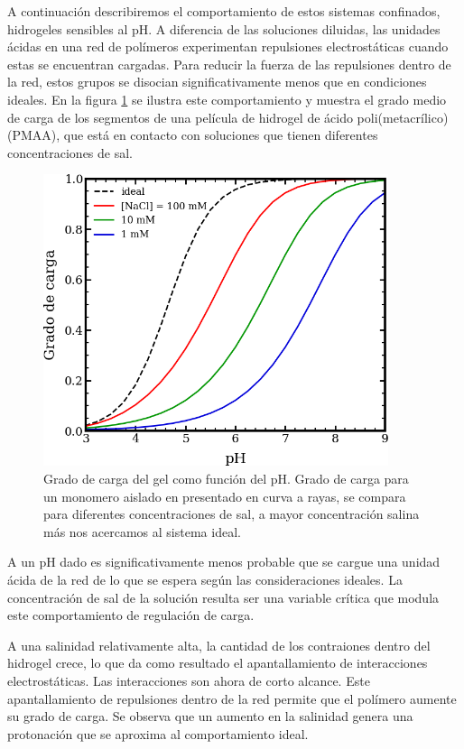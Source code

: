 A continuaci\'on describiremos el comportamiento de estos sistemas confinados, hidrogeles sensibles al pH.  A diferencia de las soluciones diluidas, las unidades \'acidas en una red de pol\'imeros experimentan repulsiones electrost\'aticas cuando estas se encuentran cargadas. Para reducir la fuerza de las repulsiones dentro de la red, estos grupos se disocian significativamente menos que en condiciones ideales. En la figura \ref{fig:degree-film} se ilustra este comportamiento y muestra el grado medio de carga de los segmentos de una pel\'icula de hidrogel de \'acido poli(metacr\'ilico) (PMAA), que est\'a en contacto con soluciones que tienen diferentes concentraciones de sal.
\begin{figure}
    \centering
    \includegraphics[width=0.9\textwidth]{Figures/graph-film/charge_degree-film.png}
    \caption{Grado de carga del gel como funci\'on del pH. Grado de carga para un monomero aislado en presentado en curva a rayas, se compara para diferentes concentraciones de sal, a mayor concentraci\'on salina m\'as nos acercamos al sistema ideal.}
    \label{fig:degree-film}
\end{figure}



A un pH dado es significativamente menos probable que se cargue una unidad \'acida de la red de lo que se espera seg\'un las consideraciones ideales. La concentraci\'on de sal de la soluci\'on resulta ser una variable cr\'itica que modula este comportamiento de regulación de carga.

A una salinidad relativamente alta, la cantidad de los contraiones dentro del hidrogel crece, lo que da como resultado el apantallamiento de interacciones electrost\'aticas. Las interacciones son ahora de corto alcance. Este apantallamiento de repulsiones dentro de la red permite que el pol\'imero aumente su grado de carga. Se observa que un aumento en la salinidad genera una protonaci\'on que se aproxima al comportamiento ideal. 

